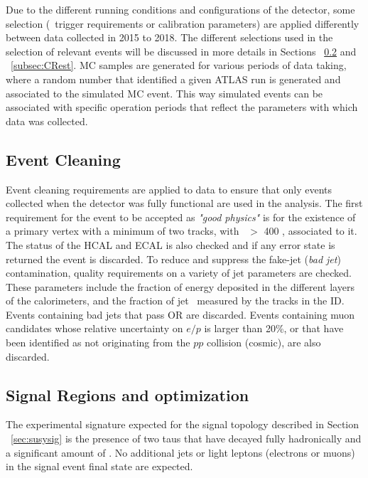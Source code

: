 	Due to the different running conditions and configurations of the detector, some selection (\eg\ trigger requirements or calibration parameters) are applied differently between data collected in 2015 to 2018. The different selections used in the selection of relevant events will be discussed in more details in Sections ~\ref{subsec:SRopt} and ~\ref{subsec:CRest}.
	\ac{MC} samples are generated for various periods of data taking, where a random number that identified a given \ac{ATLAS} run is generated and associated to the simulated \ac{MC} event. This way simulated events can be associated with specific operation periods that reflect the parameters with which data was collected. 
	
	\subsection{Event Cleaning}
	\label{subsec:evntcleaning}
	Event cleaning requirements are applied to data to ensure that only events collected when the detector was fully functional are used in the analysis.
	The first requirement for the event to be accepted as \textit{"good physics"} is for the existence of a primary vertex with a minimum of two tracks, with \pt\ $>$ 400 \mev, associated to it. 
	The status of the \ac{HCAL} and \ac{ECAL} is also checked and if any error state is returned the event is discarded.
	To reduce and suppress the fake-jet (\textit{bad jet}) contamination, quality requirements on a variety of jet parameters are checked. 
	These parameters include the fraction of energy deposited in the different layers of the calorimeters, and the fraction of jet \pt\ measured by the tracks in the \ac{ID}. 
	Events containing bad jets that pass \ac{OR} are discarded. 
	Events containing muon candidates whose relative uncertainty on $e/p$ is larger than 20\%, or that have been identified as not originating from the $pp$ collision (cosmic), are also discarded. 
	\subsection{Signal Regions and optimization}
	\label{subsec:SRopt}
	The experimental signature expected for the signal topology described in Section ~\ref{sec:susysig}  is the presence of two taus that have decayed fully hadronically and a significant amount of \met. 
	No additional jets or light leptons (electrons or muons) in the signal event final state are expected.
	
